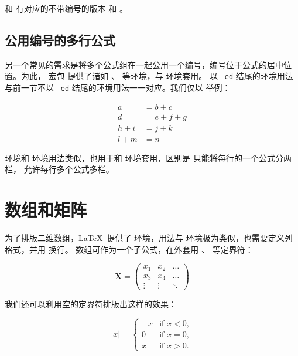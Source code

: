  和  有对应的不带编号的版本  和 。

\subsection{公用编号的多行公式}

另一个常见的需求是将多个公式组在一起公用一个编号，编号位于公式的居中位置。为此， 宏包
提供了诸如 、 等环境，与  环境套用。
以 \texttt{-ed} 结尾的环境用法与前一节不以 \texttt{-ed} 结尾的环境用法一一对应。我们仅以  举例：
\begin{example}
\begin{equation}
\begin{aligned}
a &= b + c \\
d &= e + f + g \\
h + i &= j + k \\
l + m &= n
\end{aligned}
\end{equation}
\end{example}

 环境和  环境用法类似，也用于和  环境套用，区别是  只能将每行的一个公式分两栏，
 允许每行多个公式多栏。

\section{数组和矩阵}

为了排版二维数组，\LaTeX\ 提供了  环境，用法与  环境极为类似，也需要定义列格式，并用  换行。
数组可作为一个子公式，在外套用 、 等定界符：
\begin{example}
\[
\mathbf{X} = \left(
\begin{array}{ccc}
x_1 & x_2 & \ldots \\
x_3 & x_4 & \ldots \\
\vdots & \vdots & \ddots
\end{array} \right)
\]
\end{example}

我们还可以利用空的定界符排版出这样的效果：
\begin{example}
\[
|x| = \left\{
\begin{array}{rl}
-x & \text{if } x < 0,\\
0 & \text{if } x = 0,\\
x & \text{if } x > 0.
\end{array} \right.
\]
\end{example}

